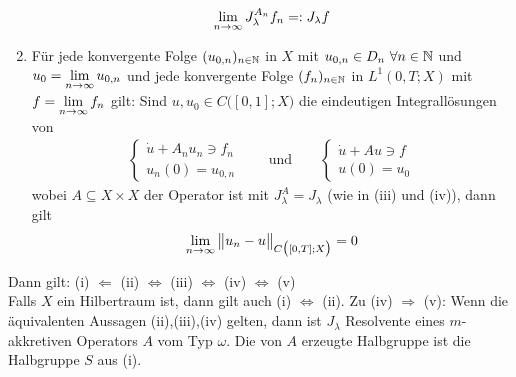 \begin{theorem}
\begin{enumerate}[label=(\roman*)]
\begin{align*}
			\lim\limits_{n\to\infty} J_\lambda^{A_n}f_n=:J_\lambda f
		\end{align*}
		\item Für jede konvergente Folge $(u_{0,n})_{n\in\mathbb{N}}$ in $X$ mit $u_{0,n}\in D_n~\forall n\in\mathbb{N}$ und\\ $u_0=\lim\limits_{n\to\infty} u_{0,n}$ und jede konvergente Folge $(f_n)_{n\in\mathbb{N}}$ in $L^1(0,T;X)$ mit $f=\lim\limits_{n\to\infty} f_n$ gilt:
		Sind $u,u_0\in C\big([0,1];X\big)$ die eindeutigen Integrallösungen von
		\begin{align*}
			\left\lbrace\begin{array}{r}
				\dot{u}+A_n u_n\ni f_n\\
				u_n(0)=u_{0,n}
			\end{array}\right.\qquad\text{und}\qquad
			\left\lbrace\begin{array}{r}
				\dot{u}+A u\ni f\\
				u(0)=u_{0}
			\end{array}\right.
		\end{align*}
		wobei $A\subseteq X\times X$ der Operator ist mit $J_\lambda^A=J_\lambda$ (wie in (iii) und (iv)), dann gilt
		\begin{align*}
			\lim\limits_{n\to\infty}\big\Vert u_n-u\big\Vert_{C\big([0,T];X\big)}=0
		\end{align*}
	\end{enumerate}
	Dann gilt: (i) $\Longleftarrow$ (ii) $\Longleftrightarrow$ (iii) $\Longleftrightarrow$ (iv) $\Longleftrightarrow$ (v)\\
	Falls $X$ ein Hilbertraum ist, dann gilt auch (i) $\Longleftrightarrow$ (ii).\nl
	Zu (iv) $\Longrightarrow$ (v): Wenn die äquivalenten Aussagen (ii),(iii),(iv) gelten, dann ist $J_\lambda$ Resolvente eines $m$-akkretiven Operators $A$ vom Typ $\omega$. Die von $A$ erzeugte Halbgruppe ist die Halbgruppe $S$ aus (i).
\end{theorem}

